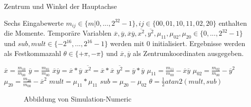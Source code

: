 \documentclass[a4paper]{report}
\begin{document}
\begin{algorithm}
\caption{Zentrum und Winkel der Hauptachse}
\label{Momente}
\begin{algorithmic}[1]
\Require Sechs Eingabewerte {$m_{ij}\in\{m|0,...,2^{32}-1\},ij\in\{00,01,10,11,02,20\}$} enthalten die Momente. Temporäre Variablen $\overline{x},\overline{y},\overline{x}\overline{y},\overline{x^2},\overline{y^2},\mu_{11},\mu_{02},\mu_{20}\in \{0,...,2^{32}-1\}$ und $sub,mult\in \{-2^{16},...,2^{16}-1\}$ werden mit 0 initialisiert. Ergebnisse werden als Festkommazahl $\theta \in \{+\pi, -\pi\}$ und  $\overline{x},\overline{y}$ als Zentrumkoordinaten ausgegeben.

	\State $\overline{x} = \frac{m_{10}}{m_{00}}$
	\State $\overline{y} = \frac{m_{01}}{m_{00}}$
	\State $\overline{x}\overline{y} = \overline{x} * \overline{y}$
	\State $\overline{x^2} = \overline{x} * \overline{x}$
	\State $\overline{y^2} = \overline{y} * \overline{y}$
	\State $\mu_{11} = \frac{m_{11}}{m_{00}} - \overline{x}\overline{y} $
	\State $\mu_{02} = \frac{m_{02}}{m_{00}} - \overline{y}^2 $
	\State $\mu_{20} = \frac{m_{20}}{m_{00}} - \overline{x}^2 $
	\State $mult = \mu_{11}* \mu_{11}$
    \State $sub = \mu_{20}-\mu_{02}$
	\State $\theta = \frac{1}{2} atan2(mult, sub)$
\EndIf
\end{algorithmic}
\end{algorithm}

\begin{figure}[H]
\centering
{}
\caption{Abbildung von Simulation-Numeric}
\label{fig:Abbildung_von_Simulation_-_Numeric}
\end{figure}
\end{document}
